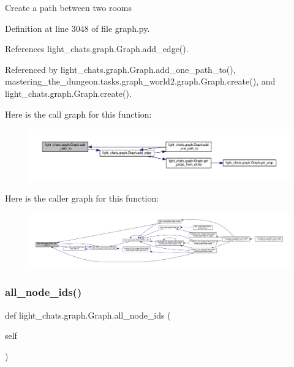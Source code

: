 \begin{DoxyVerb}Create a path between two rooms\end{DoxyVerb}
 

Definition at line 3048 of file graph.\+py.



References light\+\_\+chats.\+graph.\+Graph.\+add\+\_\+edge().



Referenced by light\+\_\+chats.\+graph.\+Graph.\+add\+\_\+one\+\_\+path\+\_\+to(), mastering\+\_\+the\+\_\+dungeon.\+tasks.\+graph\+\_\+world2.\+graph.\+Graph.\+create(), and light\+\_\+chats.\+graph.\+Graph.\+create().

Here is the call graph for this function\+:
\nopagebreak
\begin{figure}[H]
\begin{center}
\leavevmode
\includegraphics[width=350pt]{classlight__chats_1_1graph_1_1Graph_a4335de6c1c70dbbab982149a5c1e1586_cgraph}
\end{center}
\end{figure}
Here is the caller graph for this function\+:
\nopagebreak
\begin{figure}[H]
\begin{center}
\leavevmode
\includegraphics[width=350pt]{classlight__chats_1_1graph_1_1Graph_a4335de6c1c70dbbab982149a5c1e1586_icgraph}
\end{center}
\end{figure}
\mbox{\label{classlight__chats_1_1graph_1_1Graph_a1200144ee93bfb6e3abae4a41ba10cf0}} 
\subsubsection{\texorpdfstring{all\+\_\+node\+\_\+ids()}{all\_node\_ids()}}
{\footnotesize\ttfamily def light\+\_\+chats.\+graph.\+Graph.\+all\+\_\+node\+\_\+ids (\begin{DoxyParamCaption}\item[{}]{self }\end{DoxyParamCaption})}

